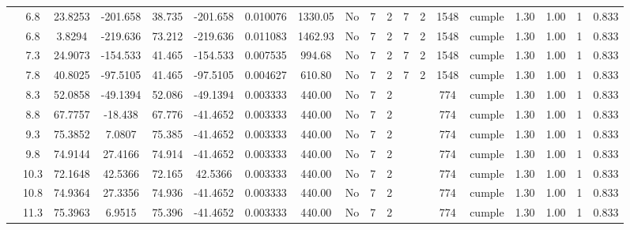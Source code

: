 \begin{table}[H]
{\begin{tabular}{|c|c|c|c|c|c|r|c|c|c|c|c|c|c|c|c|c|c|c|}
\cline{2-19}        & 6.8 & 23.8253 & -201.658 & 38.735 & -201.658 & 0.010076 & 1330.05 & No  & 7   & 2   & 7   & 2   & 1548 & \cellcolor[rgb]{ .776,  .937,  .808}cumple & 1.30 & 1.00 & 1   & 0.833 \bigstrut\\
\cline{2-19}        & 6.8 & 3.8294 & -219.636 & 73.212 & -219.636 & 0.011083 & 1462.93 & No  & 7   & 2   & 7   & 2   & 1548 & \cellcolor[rgb]{ .776,  .937,  .808}cumple & 1.30 & 1.00 & 1   & 0.833 \bigstrut\\
\cline{2-19}        & 7.3 & 24.9073 & -154.533 & 41.465 & -154.533 & 0.007535 & 994.68 & No  & 7   & 2   & 7   & 2   & 1548 & \cellcolor[rgb]{ .776,  .937,  .808}cumple & 1.30 & 1.00 & 1   & 0.833 \bigstrut\\
\cline{2-19}        & 7.8 & 40.8025 & -97.5105 & 41.465 & -97.5105 & 0.004627 & 610.80 & No  & 7   & 2   & 7   & 2   & 1548 & \cellcolor[rgb]{ .776,  .937,  .808}cumple & 1.30 & 1.00 & 1   & 0.833 \bigstrut\\
\cline{2-19}        & 8.3 & 52.0858 & -49.1394 & 52.086 & -49.1394 & 0.003333 & 440.00 & No  & 7   & 2   &     &     & 774 & \cellcolor[rgb]{ .776,  .937,  .808}cumple & 1.30 & 1.00 & 1   & 0.833 \bigstrut\\
\cline{2-19}        & 8.8 & 67.7757 & -18.438 & 67.776 & -41.4652 & 0.003333 & 440.00 & No  & 7   & 2   &     &     & 774 & \cellcolor[rgb]{ .776,  .937,  .808}cumple & 1.30 & 1.00 & 1   & 0.833 \bigstrut\\
\cline{2-19}        & 9.3 & 75.3852 & 7.0807 & 75.385 & -41.4652 & 0.003333 & 440.00 & No  & 7   & 2   &     &     & 774 & \cellcolor[rgb]{ .776,  .937,  .808}cumple & 1.30 & 1.00 & 1   & 0.833 \bigstrut\\
\cline{2-19}        & 9.8 & 74.9144 & 27.4166 & 74.914 & -41.4652 & 0.003333 & 440.00 & No  & 7   & 2   &     &     & 774 & \cellcolor[rgb]{ .776,  .937,  .808}cumple & 1.30 & 1.00 & 1   & 0.833 \bigstrut\\
\cline{2-19}        & 10.3 & 72.1648 & 42.5366 & 72.165 & 42.5366 & 0.003333 & 440.00 & No  & 7   & 2   &     &     & 774 & \cellcolor[rgb]{ .776,  .937,  .808}cumple & 1.30 & 1.00 & 1   & 0.833 \bigstrut\\
\cline{2-19}        & 10.8 & 74.9364 & 27.3356 & 74.936 & -41.4652 & 0.003333 & 440.00 & No  & 7   & 2   &     &     & 774 & \cellcolor[rgb]{ .776,  .937,  .808}cumple & 1.30 & 1.00 & 1   & 0.833 \bigstrut\\
\cline{2-19}        & 11.3 & 75.3963 & 6.9515 & 75.396 & -41.4652 & 0.003333 & 440.00 & No  & 7   & 2   &     &     & 774 & \cellcolor[rgb]{ .776,  .937,  .808}cumple & 1.30 & 1.00 & 1   & 0.833 \bigstrut\\

\end{tabular}}
\end{table}
